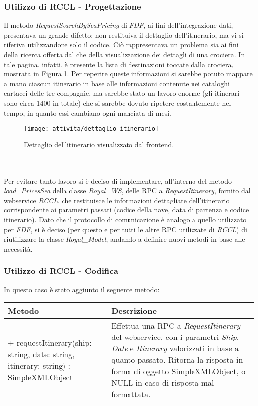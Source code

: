 \subsubsection{Utilizzo di RCCL - Progettazione}
Il metodo \textit{RequestSearchBySeaPricing} di \textit{FDF}, ai fini dell'integrazione dati, presentava un grande difetto: non restituiva il dettaglio dell'itinerario, ma vi si riferiva utilizzandone solo il codice. Ciò rappresentava un problema sia ai fini della ricerca offerta dal \bookingEngine\hphantom{i}che della visualizzazione dei dettagli di una crociera. In tale pagina, infatti, è presente la lista di destinazioni toccate dalla crociera, mostrata in Figura \ref{figura:destinazioni-crociera}. Per reperire queste informazioni si sarebbe potuto mappare a mano ciascun itinerario in base alle informazioni contenute nei cataloghi cartacei delle tre compagnie, ma sarebbe stato un lavoro enorme (gli itinerari sono circa 1400 in totale) che si sarebbe dovuto ripetere costantemente nel tempo, in quanto essi cambiano ogni manciata di mesi.\\
\begin{figure}[!h] 
	\centering 
	\texttt{[image: attivita/dettaglio\_itinerario]} 
	\caption{Dettaglio dell'itinerario visualizzato dal frontend.}
	\label{figura:destinazioni-crociera}
\end{figure}\\ \\Per evitare tanto lavoro si è deciso di implementare, all'interno del metodo \textit{load\_PricesSea} della classe \textit{Royal\_WS}, delle \gls{RPC} a \textit{RequestItinerary}, fornito dal \gls{webservice} \textit{RCCL}, che restituisce le informazioni dettagliate dell'itinerario corrispondente ai parametri passati (codice della nave, data di partenza e codice itinerario).  Dato che il protocollo di comunicazione è analogo a quello utilizzato per \textit{FDF}, si è deciso (per questo e per tutti le altre \gls{RPC} utilizzate di \textit{RCCL}) di riutilizzare la classe \textit{Royal\_Model}, andando a definire nuovi metodi in base alle necessità. 

\subsubsection{Utilizzo di RCCL - Codifica}
In questo caso è stato aggiunto il seguente metodo: 
\begin{center}
	\def\arraystretch{1.5}
	\begin{longtable}{ >{\raggedright}p{5.5cm} p{6.8cm}} 
		\hline
		\textbf{Metodo} & \textbf{Descrizione} \\
		\hline
		+ requestItinerary(ship: string, date: string, itinerary: string) : SimpleXMLObject & Effettua una \gls{RPC} a \textit{RequestItinerary} del \gls{webservice}, con i parametri \textit{Ship}, \textit{Date} e \textit{Itinerary} valorizzati in base a quanto passato. Ritorna la risposta in forma di oggetto SimpleXMLObject, o NULL in caso di risposta mal formattata.\\
		\hline
	\end{longtable}
\end{center}

